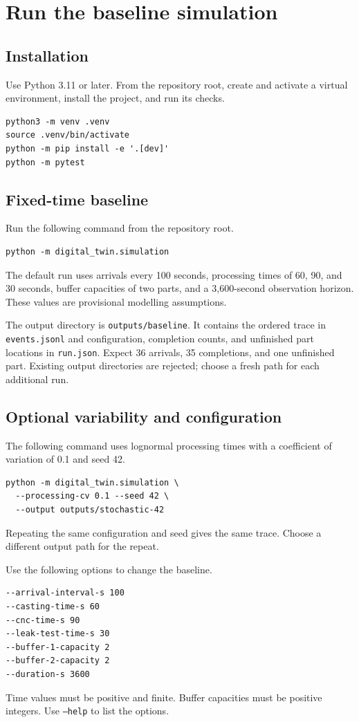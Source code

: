\section{Run the baseline simulation}

\subsection{Installation}
Use Python 3.11 or later. From the repository root, create and activate a
virtual environment, install the project, and run its checks.
\begin{verbatim}
python3 -m venv .venv
source .venv/bin/activate
python -m pip install -e '.[dev]'
python -m pytest
\end{verbatim}

\subsection{Fixed-time baseline}
Run the following command from the repository root.
\begin{verbatim}
python -m digital_twin.simulation
\end{verbatim}
The default run uses arrivals every 100 seconds, processing times of 60,
90, and 30 seconds, buffer capacities of two parts, and a 3,600-second
observation horizon. These values are provisional modelling assumptions.

The output directory is \texttt{outputs/baseline}. It contains the
ordered trace in \texttt{events.jsonl} and configuration, completion
counts, and unfinished part locations in \texttt{run.json}.
Expect 36 arrivals, 35 completions, and one unfinished part. Existing
output directories are rejected; choose a fresh path for each additional run.

\subsection{Optional variability and configuration}
The following command uses lognormal processing times with a coefficient
of variation of 0.1 and seed 42.
\begin{verbatim}
python -m digital_twin.simulation \
  --processing-cv 0.1 --seed 42 \
  --output outputs/stochastic-42
\end{verbatim}
Repeating the same configuration and seed gives the same trace. Choose a
different output path for the repeat.

Use the following options to change the baseline.
\begin{verbatim}
--arrival-interval-s 100
--casting-time-s 60
--cnc-time-s 90
--leak-test-time-s 30
--buffer-1-capacity 2
--buffer-2-capacity 2
--duration-s 3600
\end{verbatim}
Time values must be positive and finite. Buffer capacities must be
positive integers. Use \texttt{--help} to list the options.

